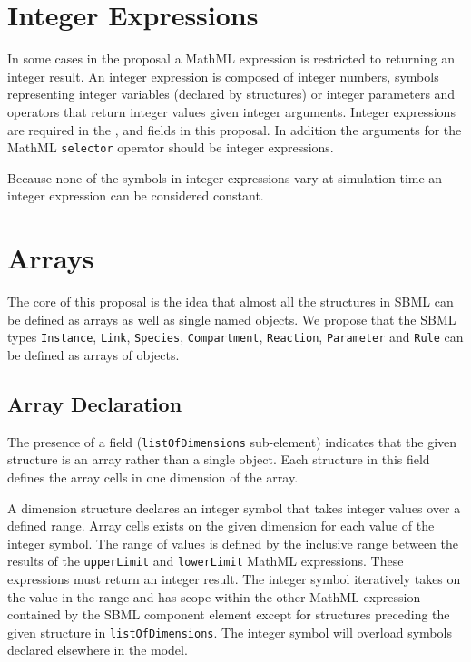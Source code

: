 \documentclass{cekarticle}
\begin{document}
\section{Integer Expressions}

In some cases in the proposal a MathML expression is restricted to returning an integer result.
An integer expression is composed of integer numbers, symbols representing integer variables (declared by  structures)
or integer parameters and
operators that return integer values given integer arguments.  Integer expressions are required in the
,  and  fields in this proposal. In addition the arguments for the
MathML \texttt{selector} operator should be integer expressions.

Because none of the symbols in integer expressions vary at simulation time an integer expression can be considered constant.

\section{Arrays}
\label{sec:arrays}

The core of this proposal is the idea that almost all the
structures in SBML can be defined as arrays as well as single
named objects.  We propose that the SBML types
\texttt{Instance}, \texttt{Link}, \texttt{Species}, \texttt{Compartment}, \texttt{Reaction},
\texttt{Parameter} and \texttt{Rule} can be defined as arrays of
objects. 

\subsection{Array Declaration}
\label{sec:arraydec}
The presence of a  field
(\texttt{listOfDimensions} sub-element) indicates that the given
structure is an array rather than a single object.  Each  structure in this field defines
the array cells in one dimension of the array.

A dimension structure declares an integer symbol that takes integer values over a defined range.  
Array cells exists on the given dimension for each value of the integer symbol.  The range of values
is defined by the inclusive range between the results of the \texttt{upperLimit} and \texttt{lowerLimit}
MathML expressions.  These expressions must return an integer result.  The integer symbol iteratively takes on the
value in the range and has scope within the other MathML expression contained by the SBML component element
except for  structures preceding the given  structure in \texttt{listOfDimensions}.
The integer symbol will overload symbols declared elsewhere in the model.
\end{document}
